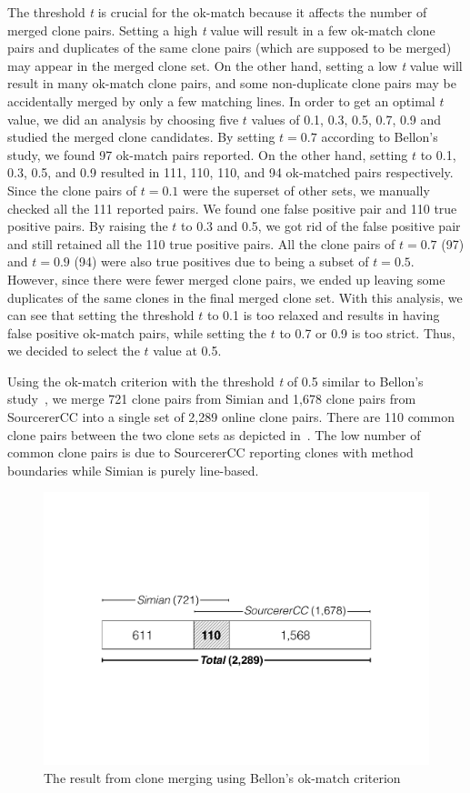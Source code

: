 \documentclass[10pt,journal,compsoc]{IEEEtran}
\begin{document}
The threshold \textit{t} is crucial for the ok-match because it affects the number
of merged clone pairs. Setting a high \textit{t} value will result in a few ok-match clone pairs
and duplicates of the same clone pairs (which are supposed to be merged) may appear in the merged
clone set. On the other hand, setting a low \textit{t} value will result in many ok-match clone
pairs, and some non-duplicate clone pairs may be accidentally merged by only
a few matching lines.
In order to get an optimal $t$ value, we did an analysis by choosing
five $t$ values of 0.1, 0.3, 0.5, 0.7, 0.9 and studied the merged clone candidates.
By setting $t=0.7$ according to Bellon's study, we
found 97 ok-match pairs reported. On the other hand, setting $t$ to 0.1, 0.3,
0.5, and 0.9 resulted in 111, 110, 110, and 94 ok-matched pairs respectively.
Since the clone pairs of $t=0.1$ were the superset of other sets,  we manually
checked all the 111 reported pairs. We found one false positive pair and 110
true positive pairs. By raising the $t$ to 0.3 and 0.5, we got rid of the false
positive pair and still retained all the 110 true positive pairs. All the clone
pairs of $t=0.7$ (97) and $t=0.9$ (94) were also true positives due to being a
subset of $t=0.5$. However, since there were fewer merged clone pairs, 
we ended up leaving some duplicates of the same clones in the final merged clone set.
With this analysis, we can see that setting the threshold $t$ to 0.1 is too
relaxed and results in having false positive ok-match pairs, while setting the
$t$ to 0.7 or 0.9 is too strict. Thus,
we decided to select the $t$ value at 0.5. 

Using the ok-match criterion with the threshold \textit{t} of 0.5
similar to Bellon's study~\cite{Bellon2007}, we merge 721 clone pairs from
Simian and 1,678 clone pairs from SourcererCC into a single set of 2,289 online
clone pairs. There are 110 common clone pairs between the two clone sets 
as depicted in~.  The low number of common
clone pairs is due to SourcererCC reporting clones with method
boundaries while Simian is purely line-based.

\begin{figure}
	\centering
	\includegraphics[width=0.8\linewidth]{clone_merging}
	\caption{The result from clone merging using Bellon's ok-match criterion}
	\label{fig:clonemerging}
\end{figure}
\end{document}
